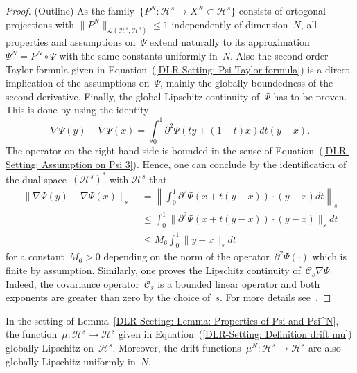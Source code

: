 \begin{proof}\autocite{Mattingly2010}(Outline)
 As the family~$\{ P^N: \mathcal{H}^s \to X^N \subset \mathcal{H}^s \}$ consists of ortogonal projections with $\| P^N \|_{\mathcal{L}(\mathcal{H}^s, \mathcal{H}^s)} \leq 1$ independently of dimension~$N$, all properties and assumptions on~$\Psi$ extend naturally to its approximation~$\Psi^N = P^N \circ \Psi$ with the same constants uniformly in~$N$. Also the second order Taylor formula given in Equation~(\ref{DLR-Setting: Psi Taylor formula}) is a direct implication of the assumptions on~$\Psi$, mainly the globally boundedness of the second derivative.  Finally, the global Lipschitz continuity of~$\Psi$ has to be proven. This is done by using the identity
 \begin{equation*}
  \nabla \Psi (y) - \nabla \Psi(x) = \int_0^1 \partial^2 \Psi (ty + (1-t)x) dt (y-x).
 \end{equation*}
 The operator on the right hand side is bounded in the sense of Equation~(\ref{DLR-Setting: Assumption on Psi 3}). Hence, one can conclude  by the identification of the dual space~$(\mathcal{H}^s)^*$ with $\mathcal{H}^s$ that
 \begin{equation*}
   \begin{split}
      \|  \nabla \Psi(y) - \nabla \Psi(x)  \|_s & \; =  \left\| \int_0^1 \partial^2 \Psi (x + t (y-x)) \cdot (y-x) dt \right\|_s \\
      & \; \leq \int_0^1 \| \partial^2 \Psi (x + t (y-x)) \cdot (y-x) \|_s dt \\
      & \; \leq M_6 \int_0^1 \| y -x \|_s dt 
   \end{split}
 \end{equation*}
 for a constant~$M_6>0$ depending on the norm of the operator~$\partial^2 \Psi(\cdot)$ which is finite by assumption. Similarly, one proves the Lipschitz continuity of~$\mathcal{C}_s \nabla \Psi$. Indeed, the covariance operator~$\mathcal{C}_s$ is a bounded linear operator and both exponents are greater than zero by the choice of~$s$. For more details see~\autocite[Lemma 3.3]{Mattingly2010}.
  
\end{proof}

\begin{cor}\autocite[Remark 2.5]{Pillai2012}
\label{DLR-Setting: Corollary: drifts are Lipschitz}
In the setting of Lemma~\ref{DLR-Seeting: Lemma: Properties of Psi and Psi^N}, the function~$\mu : \mathcal{H}^s \to \mathcal{H}^s$ given in Equation~(\ref{DLR-Setting: Definition drift mu}) globally Lipschitz on~$\mathcal{H}^s$. Moreover, the drift functions~$\mu^N : \mathcal{H}^s \to \mathcal{H}^s$ are also globally Lipschitz uniformly in~$N$.
 
\end{cor}

